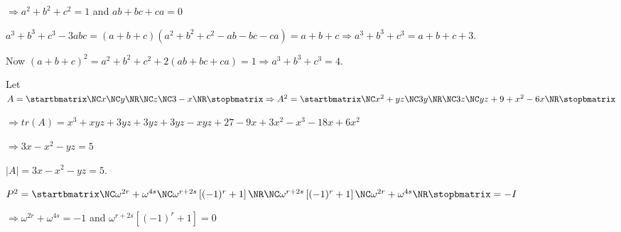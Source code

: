   $\Rightarrow a^2 + b^2 + c^2 = 1$ and $ab + bc + ca = 0$

  $a^3 + b^3 + c^3 - 3abc = (a + b + c)\left(a^2 + b^2 + c^2 - ab - bc - ca\right) = a + b + c \Rightarrow
  a^3 + b^3 + c^3 = a + b + c + 3$.

  Now $(a + b + c)^2 = a^2 + b^2 + c^2 + 2(ab + bc + ca) = 1 \Rightarrow a^3 + b^3 + c^3 = 4$.
\item Let $A = \startbmatrix\NC x\NC y\NR\NC z\NC 3 - x\NR\stopbmatrix\Rightarrow A^2 = \startbmatrix\NC
  x^2 + yz\NC 3y\NR\NC 3z\NC yz + 9 + x^2 - 6x\NR\stopbmatrix$

  $\Rightarrow tr(A) = x^3 + xyz + 3yz + 3yz + 3yz - xyz + 27 - 9x + 3x^2 - x^3 - 18x + 6x^2$

  $\Rightarrow 3x - x^2 - yz = 5$

  $|A| = 3x - x^2 - yz = 5$.
\item $P^2 = \startbmatrix\NC \omega^{2r} + \omega^{4s}\NC \omega^{r + 2s}\left[(-1)^r +
  1\right]\NR\NC \omega^{r + 2s}\left[(-1)^r + 1\right]\NC \omega^{2r} + \omega^{4s}\NR\stopbmatrix = -I$

  $\Rightarrow \omega^{2r} + \omega^{4s} = -1$ and $\omega^{r + 2s}\left[(-1)^r + 1\right] = 0$

